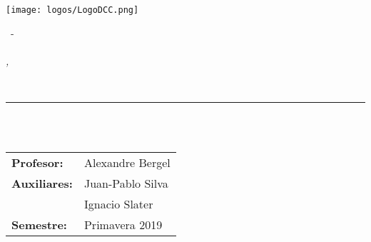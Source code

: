 \begin{minipage}{0.4\textwidth}
  \texttt{[image: logos/LogoDCC.png]}
\end{minipage}
\hfill
\begin{minipage}{0.6\textwidth}
  \begin{flushright}
    \textsc{\codigoCurso\ - \nombreCurso} \\
    \fecha \\
    \small{\textit{\ciudad, \pais}}
  \end{flushright}
  \vspace{-0.45cm}
\end{minipage}
\\[2ex]
\rule{\linewidth}{0.2 mm}

\begin{center}
  {\Large
    \textbf{\titulo} \\
    \textit{\subtitulo} \\
  }
  \begin{tabular}{l l}
    \textbf{Profesor:}    & Alexandre Bergel    \\
    \textbf{Auxiliares:}  & Juan-Pablo Silva    \\
                          & Ignacio Slater      \\
    \textbf{Semestre:}    & Primavera 2019
  \end{tabular}
\end{center}
